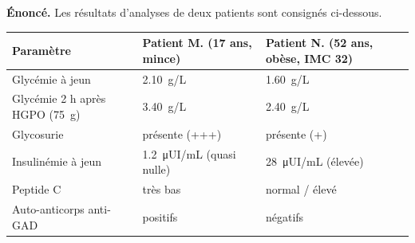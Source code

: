 \documentclass[11pt]{article}
\begin{document}
\begin{exoresolu}
\textbf{Énoncé.} Les résultats d'analyses de deux patients sont consignés ci-dessous.

\begin{center}
\begin{tabularx}{\linewidth}{|l|X|X|}\hline
\rowcolor{popblueL} \textbf{Paramètre} & \textbf{Patient M.} (17 ans, mince) & \textbf{Patient N.} (52 ans, obèse, IMC 32) \\ \hline
Glycémie à jeun & \SI{2,10}{g/L} & \SI{1,60}{g/L} \\ \hline
Glycémie 2 h après HGPO (\SI{75}{g}) & \SI{3,40}{g/L} & \SI{2,40}{g/L} \\ \hline
Glycosurie & présente (+++) & présente (+) \\ \hline
Insulinémie à jeun & \SI{1,2}{\micro UI/mL} (quasi nulle) & \SI{28}{\micro UI/mL} (élevée) \\ \hline
Peptide C & très bas & normal / élevé \\ \hline
Auto-anticorps anti-GAD & positifs & négatifs \\ \hline
\end{tabularx}
\end{center}


\end{exoresolu}
\end{document}
